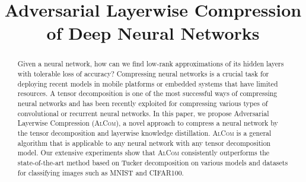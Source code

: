\documentclass[runningheads]{llncs}
\newcommand{\methodlong}[0]{Adversarial Layerwise Compression}
\newcommand{\method}[0]{\textsc{AlCom}\xspace}
\begin{document}
\title{Adversarial Layerwise Compression of Deep Neural Networks
}

%

\maketitle              %

\begin{abstract}

Given a neural network, how can we find low-rank approximations of its hidden layers with tolerable loss of accuracy?
Compressing neural networks is a crucial task for deploying recent models in mobile platforms or embedded systems that have limited resources.
A tensor decomposition is one of the most successful ways of compressing neural networks and has been recently exploited for compressing various types of convolutional or recurrent neural networks.
In this paper, we propose \methodlong{} (\method{}), a novel approach to compress a neural network by the tensor decomposition and layerwise knowledge distillation.
\method{} is a general algorithm that is applicable to any neural network with any tensor decomposition model.
Our extensive experiments show that \method{} consistently outperforms the state-of-the-art method based on Tucker decomposition on various models and datasets for classifying images such as MNIST and CIFAR100.

\end{abstract}













\end{document}
